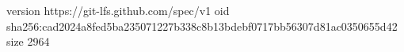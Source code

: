 version https://git-lfs.github.com/spec/v1
oid sha256:cad2024a8fed5ba235071227b338c8b13bdebf0717bb56307d81ac0350655d42
size 2964
